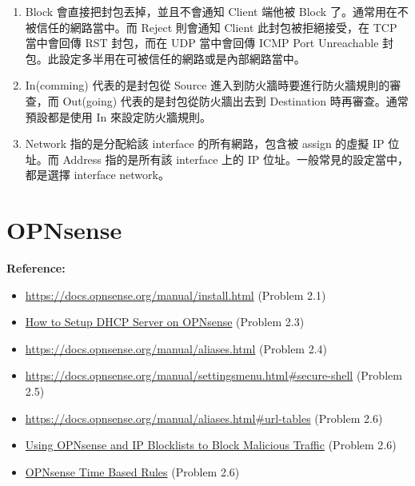 \documentclass[12pt]{article}
\newenvironment{mycolorbox}[1][gray]{
  \renewmdenv[
    linewidth=2pt, linecolor=#1, backgroundcolor=#1!10,
    topline=false, bottomline=false, rightline=false,
    skipabove=10pt, skipbelow=10pt, innerleftmargin=10pt,
    innerrightmargin=0pt, innertopmargin=5pt, innerbottommargin=5pt
  ]{myquote}
  \begin{myquote}
}{\end{myquote}}
\begin{document}
\begin{enumerate}
  \item Block 會直接把封包丟掉，並且不會通知 Client 端他被 Block 了。通常用在不被信任的網路當中。而 Reject 則會通知 Client 此封包被拒絕接受，在 TCP 當中會回傳 RST 封包，而在 UDP 當中會回傳 ICMP Port Unreachable 封包。此設定多半用在可被信任的網路或是內部網路當中。

  \item In(comming) 代表的是封包從 Source 進入到防火牆時要進行防火牆規則的審查，而 Out(going) 代表的是封包從防火牆出去到 Destination 時再審查。通常預設都是使用 In 來設定防火牆規則。

  \item Network 指的是分配給該 interface 的所有網路，包含被 assign 的虛擬 IP 位址。而 Address 指的是所有該 interface 上的 IP 位址。一般常見的設定當中，都是選擇 interface network。
\end{enumerate}

\section{OPNsense}
\begin{mycolorbox}[teal]
  \textbf{Reference:}
  \footnotesize
  \begin{itemize}
    \item \url{https://docs.opnsense.org/manual/install.html} (Problem 2.1)
    \item \href{https://www.zenarmor.com/docs/network-security-tutorials/how-to-setup-dhcp-server-on-opnsense/}{How to Setup DHCP Server on OPNsense} (Problem 2.3)
    \item \url{https://docs.opnsense.org/manual/aliases.html} (Problem 2.4)
    \item \url{https://docs.opnsense.org/manual/settingsmenu.html#secure-shell} (Problem 2.5)
    \item \url{https://docs.opnsense.org/manual/aliases.html#url-tables} (Problem 2.6)
    \item \href{https://www.allthingstech.ch/using-opnsense-and-ip-blocklists-to-block-malicious-traffic/}{Using OPNsense and IP Blocklists to Block Malicious Traffic} (Problem 2.6)
    \item \href{https://www.provya.com/blog/opnsense-time-based-rules/}{OPNsense Time Based Rules} (Problem 2.6)
  \end{itemize}
\end{mycolorbox}

\end{document}
